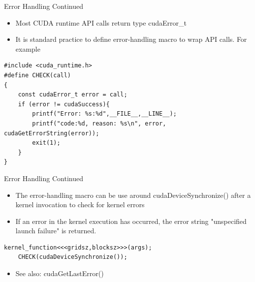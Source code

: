 \documentclass[handout]{beamer}
\begin{document}
\begin{frame}[fragile]{Error Handling Continued}
\begin{itemize}
	\item<1->Most CUDA runtime API calls return type {\selectfont cudaError\_t}
	\item<1->It is standard practice to define error-handling macro to wrap API calls.  For example
\end{itemize}
\begin{lstlisting}[caption={Error handling macro for CUDA}]
#include <cuda_runtime.h>
#define CHECK(call)
{
    const cudaError_t error = call;
    if (error != cudaSuccess){
        printf("Error: %s:%d",__FILE__,__LINE__);
        printf("code:%d, reason: %s\n", error, cudaGetErrorString(error));
        exit(1);
    }
}
\end{lstlisting}
\end{frame}

\begin{frame}[fragile]{Error Handling Continued}
\begin{itemize}
\itemsep1em
	\item<1->The error-handling macro can be use around {\selectfont cudaDeviceSynchronize()} after a kernel invocation to check for kernel errors
	\item<1->If an error in the kernel execution has occurred, the error string "unspecified launch failure" is returned.
\end{itemize}
\begin{lstlisting}[caption={Catching kernel failures with CHECK macro}]
    kernel_function<<<gridsz,blocksz>>>(args);
    CHECK(cudaDeviceSynchronize());
\end{lstlisting}
\begin{itemize}
	\item<1->See also: {\selectfont cudaGetLastError()}
\end{itemize}
\end{frame}
\end{document}
